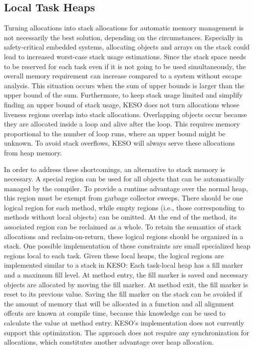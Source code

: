 		\subsection{Local Task Heaps}
			\label{sub:eea:opt:ldh}
			Turning allocations into stack allocations for automatic memory management is not necessarily the best solution,
			depending on the circumstances. Especially in safety-critical embedded systems, allocating objects and arrays on
			the stack could lead to increased worst-case stack usage estimations. Since the stack space needs to be reserved
			for each task even if it is not going to be used simultaneously, the overall memory requirement can increase
			compared to a system without escape analysis. This situation occurs when the sum of upper bounds is larger than
			the upper bound of the sum. Furthermore, to keep stack usage limited and simplify finding an upper bound of stack
			usage, KESO does not turn allocations whose liveness regions overlap into stack allocations. Overlapping objects
			occur because they are allocated inside a loop and alive after the loop. This requires memory proportional to the
			number of loop runs, where an upper bound might be unknown. To avoid stack overflows, KESO will always serve these
			allocations from heap memory.

			In order to address these shortcomings, an alternative to stack memory is necessary. A special region can be used
			for all objects that can be automatically managed by the compiler. To provide a runtime advantage over the normal
			heap, this region must be exempt from garbage collector sweeps. There should be one logical region for each
			method, while empty regions (i.e., those corresponding to methods without local objects) can be omitted. At the
			end of the method, its associated region can be reclaimed as a whole. To retain the semantics of stack allocations
			and reclaim-on-return, these logical regions should be organized in a stack. One possible implementation of these
			constraints are small specialized heap regions local to each task. Given these local heaps, the logical regions
			are implemented similar to a stack in KESO: Each task-local heap has a fill marker and a maximum fill level. At
			method entry, the fill marker is saved and necessary objects are allocated by moving the fill marker. At method
			exit, the fill marker is reset to its previous value. Saving the fill marker on the stack can be avoided if the
			amount of memory that will be allocated in a function and all alignment offcuts are known at compile time, because
			this knowledge can be used to calculate the value at method entry. KESO's implementation does not currently
			support this optimization. The approach does not require any synchronization for allocations, which constitutes
			another advantage over heap allocation.

